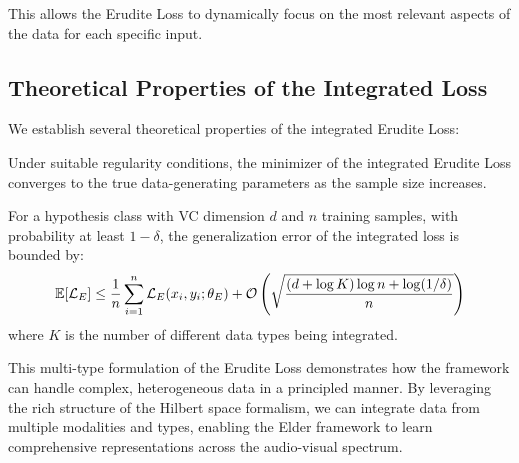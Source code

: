 This allows the Erudite Loss to dynamically focus on the most relevant aspects of the data for each specific input.

\subsection{Theoretical Properties of the Integrated Loss}

We establish several theoretical properties of the integrated Erudite Loss:

\begin{theorem}
Under suitable regularity conditions, the minimizer of the integrated Erudite Loss converges to the true data-generating parameters as the sample size increases.
\end{theorem}

\begin{theorem}
For a hypothesis class with VC dimension $d$ and $n$ training samples, with probability at least $1-\delta$, the generalization error of the integrated loss is bounded by:
\begin{equation}
\mathbb{E}[\mathcal{L}_E] \leq \frac{1}{n}\sum_{i=1}^n \mathcal{L}_E(x_i, y_i; \theta_E) + \mathcal{O}\left(\sqrt{\frac{(d + \log K) \log n + \log(1/\delta)}{n}}\right)
\end{equation}
where $K$ is the number of different data types being integrated.
\end{theorem}

This multi-type formulation of the Erudite Loss demonstrates how the framework can handle complex, heterogeneous data in a principled manner. By leveraging the rich structure of the Hilbert space formalism, we can integrate data from multiple modalities and types, enabling the Elder framework to learn comprehensive representations across the audio-visual spectrum.